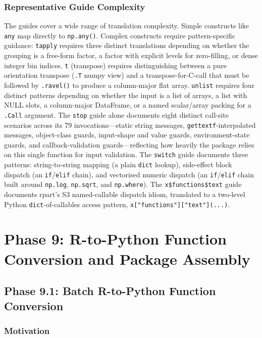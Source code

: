 \documentclass[12pt]{article}
\begin{document}
\subsubsection{Representative Guide Complexity}

The guides cover a wide range of translation complexity. Simple constructs like \texttt{any} map directly to \texttt{np.any()}. Complex constructs require pattern-specific guidance: \texttt{tapply} requires three distinct translations depending on whether the grouping is a free-form factor, a factor with explicit levels for zero-filling, or dense integer bin indices. \texttt{t} (transpose) requires distinguishing between a pure orientation transpose (\texttt{.T} numpy view) and a transpose-for-C-call that must be followed by \texttt{.ravel()} to produce a column-major flat array. \texttt{unlist} requires four distinct patterns depending on whether the input is a list of arrays, a list with NULL slots, a column-major DataFrame, or a named scalar/array packing for a \texttt{.Call} argument. The \texttt{stop} guide alone documents eight distinct call-site scenarios across its 79 invocations---static string messages, \texttt{gettextf}-interpolated messages, object-class guards, input-shape and value guards, environment-state guards, and callback-validation guards---reflecting how heavily the package relies on this single function for input validation. The \texttt{switch} guide documents three patterns: string-to-string mapping (a plain \texttt{dict} lookup), side-effect block dispatch (an \texttt{if}/\texttt{elif} chain), and vectorised numeric dispatch (an \texttt{if}/\texttt{elif} chain built around \texttt{np.log}, \texttt{np.sqrt}, and \texttt{np.where}). The \texttt{x\$functions\$text} guide documents rpart's S3 named-callable dispatch idiom, translated to a two-level Python \texttt{dict}-of-callables access pattern, \texttt{x["functions"]["text"](...)}.

\section{Phase 9: R-to-Python Function Conversion and Package Assembly}
\label{sec:phase9}

\subsection{Phase 9.1: Batch R-to-Python Function Conversion}
\label{sec:phase9.1}

\subsubsection{Motivation}
\end{document}
